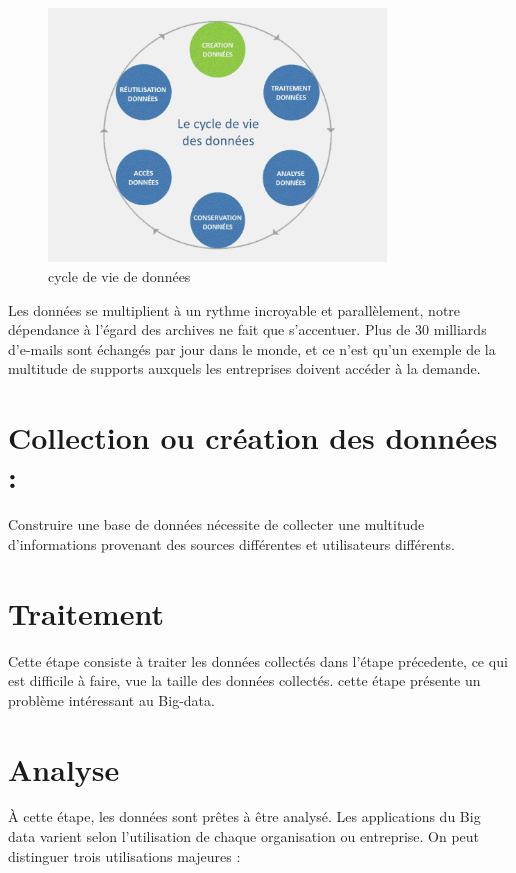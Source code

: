 \documentclass[11pt,twoside,openany,x11names,svgnames]{memoir}
\begin{document}
		  
			\begin{figure}[h]
				\centering
					\includegraphics[width=0.80\textwidth]{o_fbc17caea503ddea-0.png}
				\caption{cycle de vie de données}
				\label{fig:o_fbc17caea503ddea-0}
			\end{figure}
			
		

Les données se multiplient à un rythme incroyable et parallèlement, notre dépendance à l’égard des archives ne fait que s’accentuer. Plus de 30 milliards d’e-mails sont échangés par jour dans le monde, et ce n’est qu’un exemple de la multitude de supports auxquels les entreprises doivent accéder à la demande. 
		 \section{Collection ou création des données :}
			Construire une base de données nécessite de collecter une multitude d’informations provenant des sources différentes et utilisateurs différents.
				\section{Traitement}
		Cette \'etape consiste à traiter les données collect\'es dans l'étape pr\'ecedente, ce qui est difficile à faire, vue la taille des données collect\'es. cette étape présente un problème intéressant au Big-data.
				
				
		\section{Analyse}
		
		\`A cette étape, les données sont prêtes à être analysé. Les applications du Big data varient selon l’utilisation de chaque organisation ou entreprise. On peut distinguer trois utilisations majeures :
		
\end{document}
